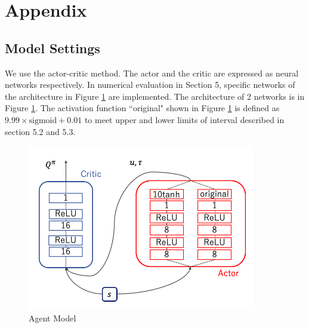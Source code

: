\documentclass[english, dvipdfmx]{ampmt}             %
\def\numberofspines{1}
\begin{document}

\appendix

\section{Appendix}
\subsection{Model Settings}
We use the actor-critic method. The actor and the critic are expressed as neural networks respectively. In numerical evaluation in Section 5, specific networks of the architecture in Figure \ref{NN} are implemented. The architecture of 2 networks is in Figure \ref{NN}.
The activation function ``original" shown in Figure \ref{NN} is defined as $9.99 \times \textrm{sigmoid} + 0.01$ to meet upper and lower limits of interval described in section 5.2 and 5.3.
\begin{figure}[h]
	\centering
 	\includegraphics[width=10cm]{model.png}
 	\caption{Agent Model} \label{NN}
\end{figure}

\fi
\ifoutputcover
\cleardoublepage
\makecover                      %
\makespine[\numberofspines]     %
\fi
\ifoutputabstractforsubmission
\makeabstractforsubmission      %
\fi
\end{document}
